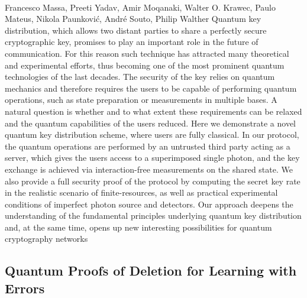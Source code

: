 \documentclass{article}%
\begin{document}
\paragraph{}%
Francesco Massa, Preeti Yadav, Amir Moqanaki, Walter O. Krawec, Paulo Mateus, Nikola Paunković, André Souto, Philip Walther%
Quantum key distribution, which allows two distant parties to share a perfectly secure cryptographic key, promises to play an important role in the future of communication. For this reason such technique has attracted many theoretical and experimental efforts, thus becoming one of the most prominent quantum technologies of the last decades. The security of the key relies on quantum mechanics and therefore requires the users to be capable of performing quantum operations, such as state preparation or measurements in multiple bases. A natural question is whether and to what extent these requirements can be relaxed and the quantum capabilities of the users reduced. Here we demonstrate a novel quantum key distribution scheme, where users are fully classical. In our protocol, the quantum operations are performed by an untrusted third party acting as a server, which gives the users access to a superimposed single photon, and the key exchange is achieved via interaction-free measurements on the shared state. We also provide a full security proof of the protocol by computing the secret key rate in the realistic scenario of finite-resources, as well as practical experimental conditions of imperfect photon source and detectors. Our approach deepens the understanding of the fundamental principles underlying quantum key distribution and, at the same time, opens up new interesting possibilities for quantum cryptography networks

%
\subsection{Quantum Proofs of Deletion for Learning with Errors}%
\label{subsec:QuantumProofsofDeletionforLearningwithErrors}%
\end{document}
